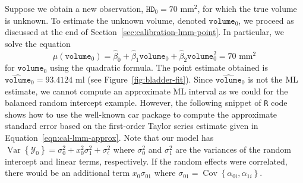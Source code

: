 \documentclass[cmfont,usenames,dvipsnames,leqno]{afit-etd}\usepackage[]{graphicx}\usepackage[]{color}
\newcommand{\code}[1]{\texttt{\small{#1}}}
\newcommand{\pkg}[1]{\textsf{\small{#1}}}
\newcommand{\mc}[1]{\ensuremath{\mathcal{#1}}}
\newcommand{\wh}[1]{\ensuremath{\widehat{#1}}}
\newcommand{\var}{\operatorname{Var}}
\newcommand{\cov}{\operatorname{Cov}}
\begin{document}
Suppose we obtain a new observation, $\texttt{HD}_0 = 70 \text{ mm}^2$, for which the true volume is unknown. To estimate the unknown volume, denoted $\texttt{volume}_0$, we proceed as discussed at the end of Section~\ref{sec:calibration-lmm-point}. In particular, we solve the equation 
\begin{equation*}
\wh{\mu}\left(\texttt{volume}_0\right) = \wh{\beta}_0 + \wh{\beta}_1\texttt{volume}_0 + \wh{\beta}_2\texttt{volume}_0^2 = 70 \text{ mm}^2
\end{equation*}
for $\texttt{volume}_0$ using the quadratic formula. The point estimate obtained is $\wh{\texttt{volume}}_0 = 93.4124$ ml (see Figure~\ref{fig:bladder-fit}). Since $\wh{\texttt{volume}}_0$ is not the \ac{ML} estimate, we cannot compute an approximate \ac{ML} interval as we could for the balanced random intercept example. However, the following snippet of \code{R} code shows how to use the well-known \pkg{car} package \citep{fox_r_2011} to compute the approximate standard error based on the first-order Taylor series estimate given in Equation~\eqref{eqn:cal-lmm-approx}. Note that our model has $\var\left\{\mc{Y}_0\right\} = \sigma_0^2 + x_0^2\sigma_1^2 + \sigma_\epsilon^2$ where $\sigma_0^2$ and $\sigma_1^2$ are the variances of the random intercept and linear terms, respectively. If the random effects were correlated, there would be an additional term $x_0\sigma_{01}$ where $\sigma_{01} = \cov\left\{\alpha_{0i}, \alpha_{1i}\right\}$. 
\end{document}
